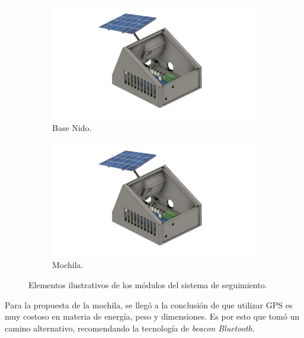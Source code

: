 \begin{figure}[H]
\begin{subfigure}{0.5\textwidth}
    \end{subfigure}	\\
    \begin{subfigure}{0.5\textwidth}
    	\centering
    	\includegraphics[width=\linewidth, page=3]{ImagenesFactibilidad/beacon}
    	\caption{Base Nido.}
    	\label{fact:nido}
    \end{subfigure}\hfill
    \begin{subfigure}{0.5\textwidth}
    	\centering
    	\includegraphics[width=\linewidth,page=4]{ImagenesFactibilidad/beacon}
    	\caption{Mochila.}
	\label{fact:beacon}
    \end{subfigure}
	\caption{Elementos ilustrativos de los módulos del sistema de seguimiento.}
	\label{fig:componentes_beacon_ilustrativo}
\end{figure}

Para la propuesta de la mochila, se llegó a la conclusión de que utilizar GPS es muy costoso en materia de energía, peso y dimensiones. Es por esto que tomó un camino alternativo, recomendando la tecnología de \textit{beacon Bluetooth}.

